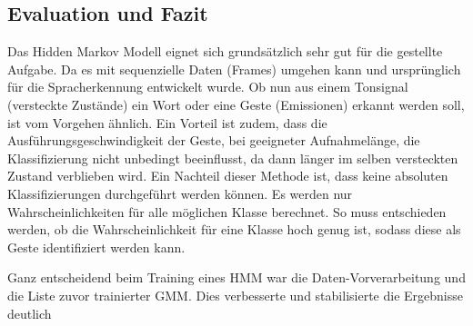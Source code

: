 \subsection{Evaluation und Fazit}  \label{sec:result}
Das Hidden Markov Modell eignet sich grundsätzlich sehr gut für die gestellte Aufgabe. Da es mit sequenzielle Daten (Frames) umgehen 
kann und ursprünglich für die Spracherkennung entwickelt wurde. Ob nun aus einem Tonsignal (versteckte Zustände) ein Wort oder 
eine Geste (Emissionen) erkannt werden soll, ist vom Vorgehen ähnlich. Ein Vorteil ist zudem, dass die Ausführungsgeschwindigkeit
 der Geste, bei geeigneter Aufnahmelänge, die Klassifizierung nicht unbedingt beeinflusst, da dann länger im selben versteckten 
 Zustand verblieben wird.
Ein Nachteil dieser Methode ist, dass keine absoluten Klassifizierungen durchgeführt werden können. Es werden nur Wahrscheinlichkeiten für alle möglichen Klasse berechnet. 
So muss entschieden werden, ob die Wahrscheinlichkeit für eine Klasse hoch genug ist, sodass diese als Geste identifiziert werden kann.

Ganz entscheidend beim Training eines \acl{HMM} war die Daten-Vorverarbeitung und die Liste zuvor trainierter \acl{GMM}. 
Dies verbesserte und stabilisierte die Ergebnisse deutlich


